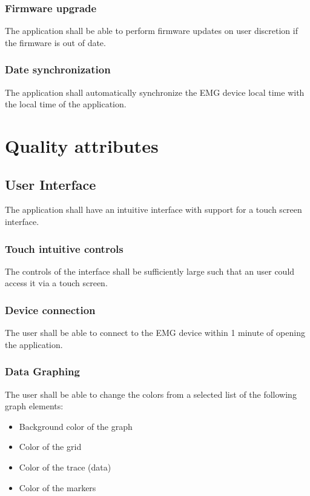 \documentclass[12pt,a4paper]{article}
\begin{document}
\subsubsection{Firmware upgrade}

The application shall be able to perform firmware updates on user discretion if the firmware is out of date.

\subsubsection{Date synchronization}

The application shall automatically synchronize the EMG device local time with the local time of the application.

\section{Quality attributes}

\subsection{User Interface}

The application shall have an intuitive interface with support for a touch screen interface.

\subsubsection{Touch intuitive controls}

The controls of the interface shall be sufficiently large such that an user could access it via a touch screen.

\subsubsection{Device connection}

The user shall be able to connect to the EMG device within 1 minute of opening the application.

\subsubsection{Data Graphing}

The user shall be able to change the colors from a selected list of the following graph elements:

\begin{itemize}
\item Background color of the graph
\item Color of the grid
\item Color of the trace (data)
\item Color of the markers
\end{itemize}
\end{document}
